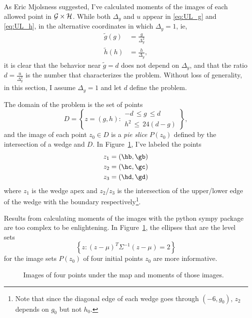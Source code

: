 \documentclass[twocolumn]{article}
\begin{document}
As Eric Mjolsness suggested, I've calculated moments of the images of
each allowed point in ${\cal G} \times {\cal H}$.  While both
$\Delta_y$ and $u$ appear in \eqref{eq:UL_g} and \eqref{eq:UL_h}, in
the alternative coordinates in which $\Delta_y=1$, ie,
\begin{align*}
  \tilde g(g) &= \frac{g}{\Delta_y^2} \\
  \tilde h(h) &= \frac{h}{\Delta_y},
\end{align*}
it is clear that the behavior near $\tilde g=d$ does not depend on
$\Delta_y$, and that the ratio $d = \frac{u}{\Delta_y^2}$ is the
number that characterizes the problem.  Without loss of generality, in
this section, I assume $\Delta_y=1$ and let $d$ define the problem.

The domain of the problem is the set of points
\begin{equation*}
  D = \left\{ z = (g,h) :
    \begin{array}{l}
      -d \, \leq g \, \leq d \\
      h^2\, \leq \, 24(d-g)
    \end{array}
    \right\},
\end{equation*}
and the image of each point $z_0 \in D$ is a \emph{pie slice} $P(z_0)$
defined by the intersection of a wedge and $D$.  In
Figure~\ref{fig:eric}, I've labeled the points
\begin{align*}
  z_1 &= \left( \hb, \gb \right) \\
  z_2 &= \left( \hc, \gc \right) \\
  z_3 &= \left( \hd, \gd \right)
\end{align*}
where $z_1$ is the wedge apex and $z_2$/$z_3$ is the intersection of
the upper/lower edge of the wedge with the boundary
respectively\footnote{Note that since the diagonal edge of each wedge
  goes through $(-6,g_0)$, $z_2$ depends on $g_0$ but not $h_0$.}.

Results from calculating moments of the images with the python sympy
package are too complex to be enlightening.  In Figure~\ref{fig:eric},
the ellipses that are the level sets
\begin{equation*}
  \left\{ z : (z-\mu)^T \Sigma^{-1} (z-\mu) = 2 \right\}
\end{equation*}
for the image sets $P(z_0)$ of four initial points $z_0$ are more
informative.

\begin{figure}
  \centering
    \caption{Images of four points under the map and moments of those
      images.}
  \label{fig:eric}
\end{figure}
\end{document}
